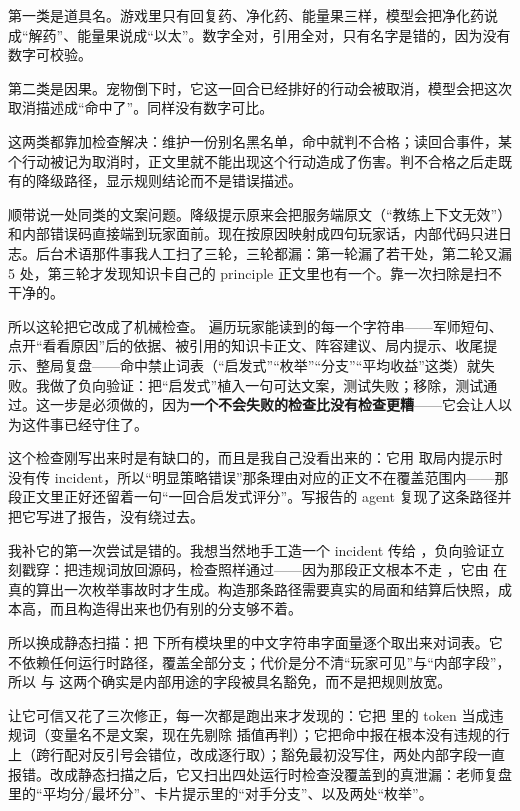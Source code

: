 第一类是道具名。游戏里只有回复药、净化药、能量果三样，模型会把净化药说成“解药”、能量果说成“以太”。数字全对，引用全对，只有名字是错的，因为没有数字可校验。

第二类是因果。宠物倒下时，它这一回合已经排好的行动会被取消，模型会把这次取消描述成“命中了”。同样没有数字可比。

这两类都靠加检查解决：维护一份别名黑名单，命中就判不合格；读回合事件，某个行动被记为取消时，正文里就不能出现这个行动造成了伤害。判不合格之后走既有的降级路径，显示规则结论而不是错误描述。

顺带说一处同类的文案问题。降级提示原来会把服务端原文（“教练上下文无效”）和内部错误码直接端到玩家面前。现在按原因映射成四句玩家话，内部代码只进日志。后台术语那件事我人工扫了三轮，三轮都漏：第一轮漏了若干处，第二轮又漏 5 处，第三轮才发现知识卡自己的 principle 正文里也有一个。靠一次扫除是扫不干净的。

所以这轮把它改成了机械检查。 遍历玩家能读到的每一个字符串——军师短句、点开“看看原因”后的依据、被引用的知识卡正文、阵容建议、局内提示、收尾提示、整局复盘——命中禁止词表（“启发式”“枚举”“分支”“平均收益”这类）就失败。我做了负向验证：把“启发式”植入一句可达文案，测试失败；移除，测试通过。这一步是必须做的，因为\textbf{一个不会失败的检查比没有检查更糟}——它会让人以为这件事已经守住了。

这个检查刚写出来时是有缺口的，而且是我自己没看出来的：它用  取局内提示时没有传 incident，所以“明显策略错误”那条理由对应的正文不在覆盖范围内——那段正文里正好还留着一句“一回合启发式评分”。写报告的 agent 复现了这条路径并把它写进了报告，没有绕过去。

我补它的第一次尝试是错的。我想当然地手工造一个 incident 传给 ，负向验证立刻戳穿：把违规词放回源码，检查照样通过——因为那段正文根本不走 ，它由  在真的算出一次枚举事故时才生成。构造那条路径需要真实的局面和结算后快照，成本高，而且构造得出来也仍有别的分支够不着。

所以换成静态扫描：把  下所有模块里的中文字符串字面量逐个取出来对词表。它不依赖任何运行时路径，覆盖全部分支；代价是分不清“玩家可见”与“内部字段”，所以  与  这两个确实是内部用途的字段被具名豁免，而不是把规则放宽。

让它可信又花了三次修正，每一次都是跑出来才发现的：它把  里的 token 当成违规词（变量名不是文案，现在先剔除  插值再判）；它把命中报在根本没有违规的行上（跨行配对反引号会错位，改成逐行取）；豁免最初没写住，两处内部字段一直报错。改成静态扫描之后，它又扫出四处运行时检查没覆盖到的真泄漏：老师复盘里的“平均分/最坏分”、卡片提示里的“对手分支”、以及两处“枚举”。

